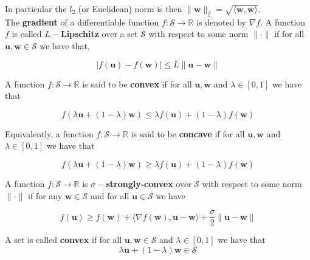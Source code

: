 In particular the $l_2$ (or Euclidean) norm is then $\|\boldsymbol{w}\|_2 = \sqrt{\langle\boldsymbol{w},\boldsymbol{w}\rangle}$. \\

The \textbf{gradient} of a differentiable function $f: \mathcal{S} \to \mathbb{R}$ is denoted by $\nabla f$. A function $f$ is called $L-$\textbf{Lipschitz} over a set $\mathcal{S}$ with respect to some norm $\|\cdot\|$ if for all $\boldsymbol{u},\boldsymbol{w} \in \mathcal{S}$ we have that, 

\begin{equation*}
    |f(\boldsymbol{u}) - f(\boldsymbol{w})| \le L\|\boldsymbol{u} - \boldsymbol{w}\|
\end{equation*}

A function $f:\mathcal{S} \to \mathbb{R}$ is said to be \textbf{convex} if for all $\mathbf{u,w}$ and $\lambda \in [0,1]$ we have that 

\begin{equation*}
    f(\lambda\boldsymbol{u} + (1-\lambda)\boldsymbol{w}) \le \lambda f(\boldsymbol{u}) + (1-\lambda)f(\boldsymbol{w})
\end{equation*}

Equivalently, a function $f:\mathcal{S} \to \mathbb{R}$ is said to be \textbf{concave} if for all $\mathbf{u,w}$ and $\lambda \in [0,1]$ we have that 

\begin{equation*}
    f(\lambda\boldsymbol{u} + (1-\lambda)\boldsymbol{w}) \ge \lambda f(\boldsymbol{u}) + (1-\lambda)f(\boldsymbol{w})
\end{equation*}

A function $f:\mathcal{S} \to \mathbb{R}$ is $\sigma-$\textbf{strongly-convex} over $\mathcal{S}$ with respect to some norm $\|\cdot\|$ if for any $\boldsymbol{w} \in \mathcal{S}$ and for all $\boldsymbol{u} \in \mathcal{S}$ we have 

\begin{equation*}
    f(\boldsymbol{u}) \ge f(\boldsymbol{w}) + \langle\nabla f(\boldsymbol{w}),\boldsymbol{u} - \boldsymbol{w}\rangle + \frac{\sigma}{2}\|\boldsymbol{u} - \boldsymbol{w}\|
\end{equation*}

A set is called \textbf{convex} if for all $\mathbf{u,w} \in \mathcal{S}$ and $\lambda \in [0,1]$ we have that 
\begin{equation*}
    \lambda\mathbf{u} + (1-\lambda)\boldsymbol{w} \in \mathcal{S} 
\end{equation*}


